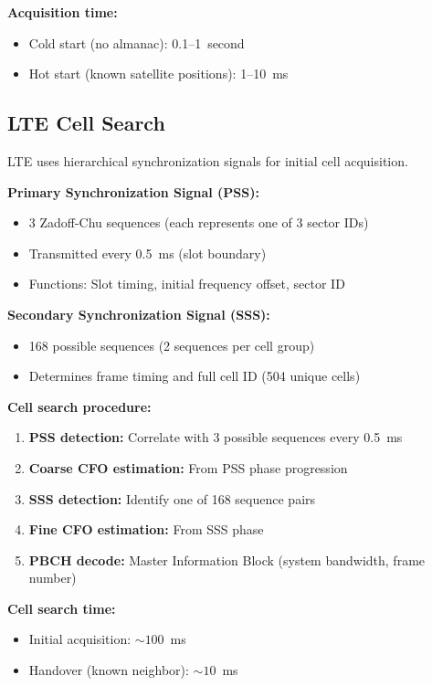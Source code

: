 \textbf{Acquisition time:}
\begin{itemize}
\item Cold start (no almanac): 0.1--1~second
\item Hot start (known satellite positions): 1--10~ms
\end{itemize}

\subsection{LTE Cell Search}

LTE uses hierarchical synchronization signals for initial cell acquisition.

\textbf{Primary Synchronization Signal (PSS):}
\begin{itemize}
\item 3 Zadoff-Chu sequences (each represents one of 3 sector IDs)
\item Transmitted every 0.5~ms (slot boundary)
\item Functions: Slot timing, initial frequency offset, sector ID
\end{itemize}

\textbf{Secondary Synchronization Signal (SSS):}
\begin{itemize}
\item 168 possible sequences (2 sequences per cell group)
\item Determines frame timing and full cell ID (504 unique cells)
\end{itemize}

\textbf{Cell search procedure:}
\begin{enumerate}
\item \textbf{PSS detection:} Correlate with 3 possible sequences every 0.5~ms
\item \textbf{Coarse CFO estimation:} From PSS phase progression
\item \textbf{SSS detection:} Identify one of 168 sequence pairs
\item \textbf{Fine CFO estimation:} From SSS phase
\item \textbf{PBCH decode:} Master Information Block (system bandwidth, frame number)
\end{enumerate}

\textbf{Cell search time:}
\begin{itemize}
\item Initial acquisition: $\sim 100$~ms
\item Handover (known neighbor): $\sim 10$~ms
\end{itemize}

